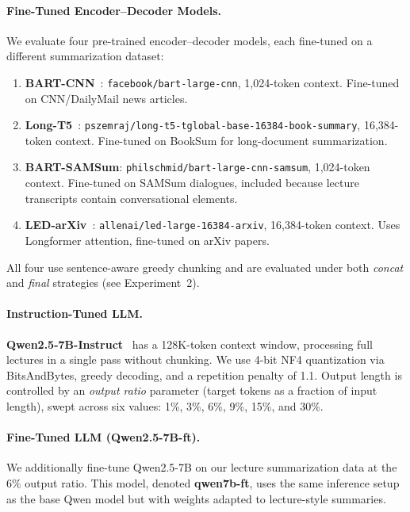 \paragraph{Fine-Tuned Encoder--Decoder Models.}
We evaluate four pre-trained encoder--decoder models, each fine-tuned on a different summarization dataset:
\begin{enumerate}
    \item \textbf{BART-CNN}~\citep{lewis2020bart}: \texttt{facebook/bart-large-cnn}, 1,024-token context. Fine-tuned on CNN/DailyMail news articles.
    \item \textbf{Long-T5}~\citep{guo2022longt5}: \texttt{pszemraj/long-t5-tglobal-base-16384-book-summary}, 16,384-token context. Fine-tuned on BookSum for long-document summarization.
    \item \textbf{BART-SAMSum}: \texttt{philschmid/bart-large-cnn-samsum}, 1,024-token context. Fine-tuned on SAMSum dialogues, included because lecture transcripts contain conversational elements.
    \item \textbf{LED-arXiv}~\citep{beltagy2020longformer}: \texttt{allenai/led-large-16384-arxiv}, 16,384-token context. Uses Longformer attention, fine-tuned on arXiv papers.
\end{enumerate}
All four use sentence-aware greedy chunking and are evaluated under both \textit{concat} and \textit{final} strategies (see Experiment~2).

\paragraph{Instruction-Tuned LLM.}
\textbf{Qwen2.5-7B-Instruct}~\citep{qwen2025qwen25} has a 128K-token context window, processing full lectures in a single pass without chunking. We use 4-bit NF4 quantization via BitsAndBytes, greedy decoding, and a repetition penalty of 1.1. Output length is controlled by an \textit{output ratio} parameter (target tokens as a fraction of input length), swept across six values: 1\%, 3\%, 6\%, 9\%, 15\%, and 30\%.

\paragraph{Fine-Tuned LLM (Qwen2.5-7B-ft).}
We additionally fine-tune Qwen2.5-7B on our lecture summarization data at the 6\% output ratio. This model, denoted \textbf{qwen7b-ft}, uses the same inference setup as the base Qwen model but with weights adapted to lecture-style summaries.

